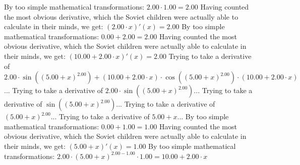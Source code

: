 \documentclass{article}
\begin{document}
\newline
By too simple mathematical transformations:
 ${{2.00} \cdot {1.00}} = {2.00}$ 
 \newline
 \newline 
Having counted the most obvious derivative, which the Soviet children were actually able to calculate in their minds, we get:
$({{2.00} \cdot {x}})'(x) = {2.00}$\newline
\newline
By too simple mathematical transformations:
 ${{0.00} + {2.00}} = {2.00}$ 
 \newline
 \newline 
Having counted the most obvious derivative, which the Soviet children were actually able to calculate in their minds, we get:
$({{10.00} + {{2.00} \cdot {x}}})'(x) = {2.00}$\newline
\newline
Trying to take a derivative of ${{{2.00} \cdot  \sin {\left({\left({{5.00} + {x}}\right) ^ {2.00}}\right)} } + {\left({{10.00} + {{2.00} \cdot {x}}}\right) \cdot { \cos {\left({\left({{5.00} + {x}}\right) ^ {2.00}}\right)}  \cdot \left({{10.00} + {{2.00} \cdot {x}}}\right)}}}$...\newline
\newline
Trying to take a derivative of ${{2.00} \cdot  \sin {\left({\left({{5.00} + {x}}\right) ^ {2.00}}\right)} }$...\newline
\newline
Trying to take a derivative of $ \sin {\left({\left({{5.00} + {x}}\right) ^ {2.00}}\right)} $...\newline
\newline
Trying to take a derivative of ${\left({{5.00} + {x}}\right) ^ {2.00}}$...\newline
\newline
Trying to take a derivative of ${{5.00} + {x}}$...\newline
\newline
By too simple mathematical transformations:
 ${{0.00} + {1.00}} = {1.00}$ 
 \newline
 \newline 
Having counted the most obvious derivative, which the Soviet children were actually able to calculate in their minds, we get:
$({{5.00} + {x}})'(x) = {1.00}$\newline
\newline
By too simple mathematical transformations:
 ${{{2.00} \cdot {\left({{5.00} + {x}}\right) ^ {{2.00} - {1.00}}}} \cdot {1.00}} = {{10.00} + {{2.00} \cdot {x}}}$ 
\end{document}
